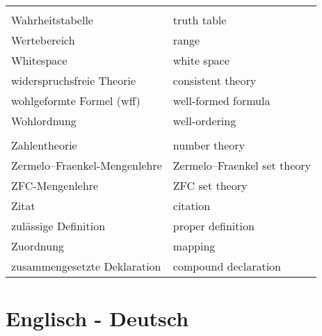 \begin{longtabu}   { @{} X[l] X[l] }
     & \\
    Wahrheitstabelle & truth table \\
    Wertebereich & range \\
    Whitespace & white space \\
    widerspruchsfreie Theorie & consistent theory \\
    wohlgeformte Formel (wff) & well-formed formula \\
    Wohlordnung & well-ordering \\
     & \\
    Zahlentheorie & number theory \\
    Zermelo--Fraenkel-{\allowbreak}Mengenlehre & Zermelo--Fraenkel set theory \\
    ZFC-Mengenlehre & ZFC set theory \\
    Zitat & citation \\
    zulässige Definition & proper definition \\
    Zuordnung & mapping \\
    zusammengesetzte Deklaration & compound declaration \\
  \end{longtabu}
  \pagebreak


\section{Englisch - Deutsch}

